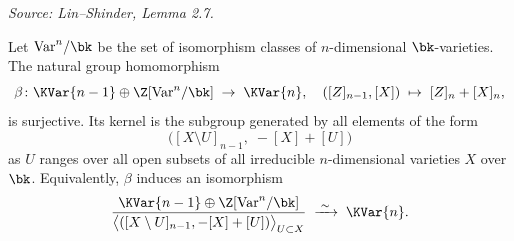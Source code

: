 \begin{lemma}
  \label{lem:kernelXU}
  \textit{Source: Lin--Shinder, Lemma 2.7.}

  Let \(\mathrm{Var}^n/\bk\) be the set of isomorphism classes of
  \(n\)-dimensional \(\bk\)-varieties.  The natural group homomorphism
  \[
    \beta \colon \KVar{n-1} \oplus \Z[\mathrm{Var}^n/\bk] \;\to\; \KVar{n},
    \quad
    ([Z]_{n-1}, [X]) \;\mapsto\; [Z]_n + [X]_n,
  \]
  is surjective.  Its kernel is the subgroup generated by all elements of the form
  \[
    \bigl([X \setminus U]_{n-1},\; -[X] + [U]\bigr)
  \]
  as \(U\) ranges over all open subsets of all irreducible \(n\)-dimensional
  varieties \(X\) over \(\bk\).  Equivalently, \(\beta\) induces an isomorphism
  \[
    \frac{\KVar{n-1} \oplus \Z[\mathrm{Var}^n/\bk]}
         {\bigl\langle ([X \setminus U]_{n-1}, -[X]+[U]) \bigr\rangle_{U \subset X}}
    \;\xrightarrow{\;\sim\;}\; \KVar{n}.
  \]
\end{lemma}
